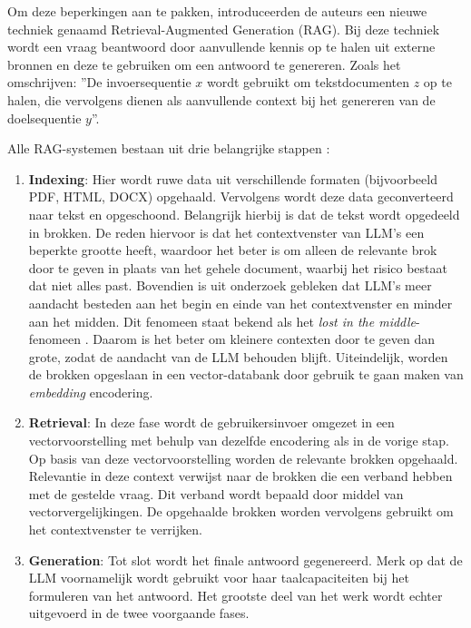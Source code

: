 Om deze beperkingen aan te pakken, introduceerden de auteurs een nieuwe techniek genaamd Retrieval-Augmented Generation (RAG). Bij deze techniek wordt een vraag beantwoord door aanvullende kennis op te halen uit externe bronnen en deze te gebruiken om een antwoord te genereren. Zoals \textcite{Lewis2020} het omschrijven: ''De invoersequentie $x$ wordt gebruikt om tekstdocumenten $z$ op te halen, die vervolgens dienen als aanvullende context bij het genereren van de doelsequentie $y$''.

Alle RAG-systemen bestaan uit drie belangrijke stappen \autocite{Gao2023}:  

\begin{enumerate} 
    \item \textbf{Indexing}: Hier wordt ruwe data uit verschillende formaten (bijvoorbeeld PDF, HTML, DOCX) opgehaald. Vervolgens wordt deze data geconverteerd naar tekst en opgeschoond. Belangrijk hierbij is dat de tekst wordt opgedeeld in brokken. De reden hiervoor is dat het contextvenster van LLM's een beperkte grootte heeft, waardoor het beter is om alleen de relevante brok door te geven in plaats van het gehele document, waarbij het risico bestaat dat niet alles past. Bovendien is uit onderzoek gebleken dat LLM's meer aandacht besteden aan het begin en einde van het contextvenster en minder aan het midden. Dit fenomeen staat bekend als het \textit{lost in the middle}-fenomeen \autocite{Databricks}. Daarom is het beter om kleinere contexten door te geven dan grote, zodat de aandacht van de LLM behouden blijft. Uiteindelijk, worden de brokken opgeslaan in een vector-databank door gebruik te gaan maken van \textit{embedding} encodering.
    \item \textbf{Retrieval}: In deze fase wordt de gebruikersinvoer omgezet in een vectorvoorstelling met behulp van dezelfde encodering als in de vorige stap. Op basis van deze vectorvoorstelling worden de relevante brokken opgehaald. Relevantie in deze context verwijst naar de brokken die een verband hebben met de gestelde vraag. Dit verband wordt bepaald door middel van vectorvergelijkingen. De opgehaalde brokken worden vervolgens gebruikt om het contextvenster te verrijken.
    \item \textbf{Generation}: Tot slot wordt het finale antwoord gegenereerd. Merk op dat de LLM voornamelijk wordt gebruikt voor haar taalcapaciteiten bij het formuleren van het antwoord. Het grootste deel van het werk wordt echter uitgevoerd in de twee voorgaande fases.
\end{enumerate}

